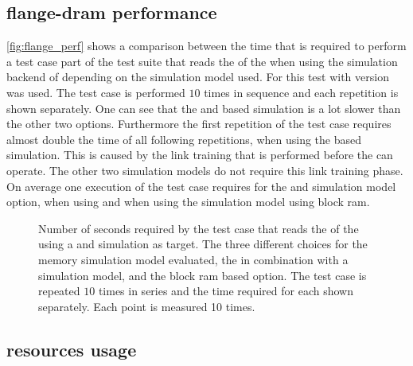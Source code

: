 \subsection{flange-dram performance}
\autoref{fig:flange_perf} shows a comparison between the time that is required to perform a test case part of the \hxcomm{} test suite that reads the \JTAGID{} of the \ASIC{} when using the simulation backend of \hxcomm{} depending on the \AXI{} \DDR{} simulation model used. For this test \xcelium{} with version \xceliumVer{} was used. The test case is performed $\num{10}$ times in sequence and each repetition is shown separately. One can see that the \XilinxMIG{} and \DDR{} based simulation is a lot slower than the other two options. Furthermore the first repetition of the test case requires almost double the time of all following repetitions, when using the \XilinxMIG{} based simulation. This is caused by the link training that is performed before the \XilinxMIG{} can operate. The other two simulation models do not require this link training phase. On average one execution of the test case requires  for the \XilinxMIG{} and \DDR{} simulation model option,  when using \flangedram{} and  when using the simulation model using block ram.


\begin{figure}
\caption{Number of seconds required by the \hxcomm{} test case that reads the \JTAGID{} of the \ASIC{} using a \FPGA{} and \ASIC{} simulation as target. The three different choices for the \AXI{} \DDR{} memory simulation model evaluated, the \XilinxMIG{} in combination with a \DDR{} simulation model, \flangedram{} and the block ram based option. The \hxcomm{} test case is repeated $\num{10}$ times in series and the time required for each shown separately. Each point is measured 10 times.}\label{fig:flange_perf}
\end{figure}

\subsection{\FPGA{} resources usage}


